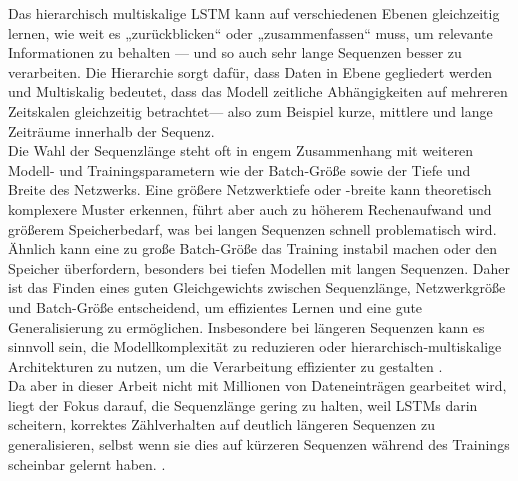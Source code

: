 \documentclass[a4paper,12pt]{article}
\begin{document}
	Das hierarchisch multiskalige LSTM kann auf verschiedenen Ebenen gleichzeitig lernen, wie weit es „zurückblicken“ oder „zusammenfassen“ muss, um relevante Informationen zu behalten — und so auch sehr lange Sequenzen besser zu verarbeiten. Die Hierarchie sorgt dafür, dass Daten in Ebene gegliedert werden und Multiskalig bedeutet, dass das Modell zeitliche Abhängigkeiten auf mehreren Zeitskalen gleichzeitig betrachtet— also zum Beispiel kurze, mittlere und lange Zeiträume innerhalb der Sequenz.
	\\[0.5em]
	Die Wahl der Sequenzlänge steht oft in engem Zusammenhang mit weiteren Modell- und Trainingsparametern wie der Batch-Größe sowie der Tiefe und Breite des Netzwerks. Eine größere Netzwerktiefe oder -breite kann theoretisch komplexere Muster erkennen, führt aber auch zu höherem Rechenaufwand und größerem Speicherbedarf, was bei langen Sequenzen schnell problematisch wird. Ähnlich kann eine zu große Batch-Größe das Training instabil machen oder den Speicher überfordern, besonders bei tiefen Modellen mit langen Sequenzen. Daher ist das Finden eines guten Gleichgewichts zwischen Sequenzlänge, Netzwerkgröße und Batch-Größe entscheidend, um effizientes Lernen und eine gute Generalisierung zu ermöglichen. Insbesondere bei längeren Sequenzen kann es sinnvoll sein, die Modellkomplexität zu reduzieren oder hierarchisch-multiskalige Architekturen zu nutzen, um die Verarbeitung effizienter zu gestalten \cite{bengio1994learning}.
	\\[0.5em]
	Da aber in dieser Arbeit nicht mit Millionen von Dateneinträgen gearbeitet wird, liegt der Fokus darauf, die Sequenzlänge gering zu halten, weil LSTMs darin scheitern, korrektes Zählverhalten auf deutlich längeren Sequenzen zu generalisieren, selbst wenn sie dies auf kürzeren Sequenzen während des Trainings scheinbar gelernt haben. \cite{elnaggar2022counting}.
	
\end{document}
